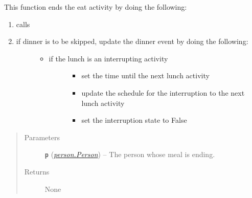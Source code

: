 \documentclass[letterpaper,10pt,english]{sphinxmanual}
\begin{document}
\begin{fulllineitems}
\begin{fulllineitems}
\begin{quote}
\begin{description}
\end{description}\end{quote}

\end{fulllineitems}


\begin{fulllineitems}
\label{eat:eat.Eat_Lunch.end_meal}
This function ends the eat activity by doing the following:
\begin{enumerate}
\item {} 
calls 

\item {} \begin{description}
\item[{if dinner is to be skipped, update the dinner event by doing the following:}] \leavevmode\begin{itemize}
\item {} \begin{description}
\item[{if the lunch is an interrupting activity}] \leavevmode\begin{itemize}
\item {} 
set the time until the next lunch activity

\item {} 
update the schedule for the interruption to the next lunch activity

\item {} 
set the interruption state to False

\end{itemize}

\end{description}

\end{itemize}

\end{description}

\end{enumerate}
\begin{quote}\begin{description}
\item[{Parameters}] \leavevmode
\textbf{\texttt{p}} ({\hyperref[person:person.Person]{\emph{\emph{person.Person}}}}) -- The person whose meal is ending.

\item[{Returns}] \leavevmode
None


\end{description}
\end{quote}
\end{fulllineitems}
\end{fulllineitems}
\end{document}
